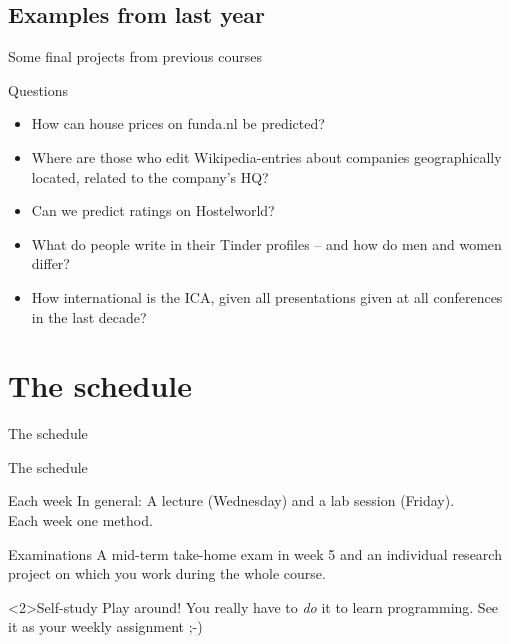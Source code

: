 \documentclass{beamer}
\begin{document}
\subsection{Examples from last year}
\begin{frame}{Some final projects from previous courses}
\begin{block}{Questions}
\begin{itemize}
\item How can house prices on funda.nl be predicted?
\item Where are those who edit Wikipedia-entries about companies geographically located, related to the company's HQ?
\item Can we predict ratings on Hostelworld?
\item What do people write in their Tinder profiles -- and how do men and women differ?
\item How international is the ICA, given all presentations given at all conferences in the last decade?
\end{itemize}
\end{block}

\end{frame}




\section{The schedule}
\begin{frame}
The schedule
\end{frame}

\begin{frame}{The schedule}
\begin{block}{Each week}
In general: A lecture (Wednesday) and a lab session (Friday). \\ Each week one method.
\end{block}
\begin{block}{Examinations}
A mid-term take-home exam in week 5 and an individual research project on which you work during the whole course.
\end{block}


\begin{alertblock}<2>{Self-study}
Play around! You really have to \emph{do} it to learn programming. See it as your weekly assignment ;-)
\end{alertblock}
\end{frame}
\end{document}
